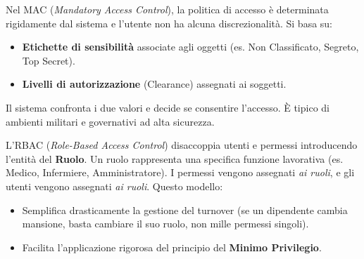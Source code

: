 \begin{defbox}
Nel MAC (\textit{Mandatory Access Control}), la politica di accesso è determinata rigidamente dal sistema e l'utente non ha alcuna discrezionalità. Si basa su:
\begin{itemize}
    \item \textbf{Etichette di sensibilità} associate agli oggetti (es. Non Classificato, Segreto, Top Secret).
    \item \textbf{Livelli di autorizzazione} (Clearance) assegnati ai soggetti.
\end{itemize}
Il sistema confronta i due valori e decide se consentire l'accesso. È tipico di ambienti militari e governativi ad alta sicurezza.
\end{defbox}

\begin{defbox}
L'RBAC (\textit{Role-Based Access Control}) disaccoppia utenti e permessi introducendo l'entità del \textbf{Ruolo}.
Un ruolo rappresenta una specifica funzione lavorativa (es. Medico, Infermiere, Amministratore). I permessi vengono assegnati \textit{ai ruoli}, e gli utenti vengono assegnati \textit{ai ruoli}.
Questo modello:
\begin{itemize}
    \item Semplifica drasticamente la gestione del turnover (se un dipendente cambia mansione, basta cambiare il suo ruolo, non mille permessi singoli).
    \item Facilita l'applicazione rigorosa del principio del \textbf{Minimo Privilegio}.
\end{itemize}
\end{defbox}

\begin{center}
\end{center}

